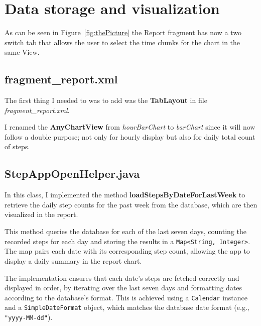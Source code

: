 \section{Data storage and visualization}
    
    As can be seen in Figure~\ref{fig:thePicture} the Report fragment has now a two switch tab
    that allows the user to select the time chunks for the chart in the same View.
    
\subsection{fragment\_report.xml}\label{subsec:fragment_report.xml}
        The first thing I needed to was to add was the \textbf{TabLayout} in file
        \textit{fragment\_report.xml}.

    
    
    I renamed the \textbf{AnyChartView} from \textit{hourBarChart} to \textit{barChart}
        since it will now follow a double purpose; not only for hourly display but also for daily total count of steps.
    
    \subsection{StepAppOpenHelper.java}
        In this class, I implemented the method \textbf{loadStepsByDateForLastWeek} to retrieve the daily step counts for the past week from the database, which are then visualized in the report.
        
        This method queries the database for each of the last seven days, counting the recorded steps for each day and storing the results in a \texttt{Map<String, Integer>}. The map pairs each date with its corresponding step count, allowing the app to display a daily summary in the report chart.
        
        The implementation ensures that each date’s steps are fetched correctly and displayed in order, by iterating over the last seven days and formatting dates according to the database’s format. This is achieved using a \texttt{Calendar} instance and a \texttt{SimpleDateFormat} object, which matches the database date format (e.g., \texttt{"yyyy-MM-dd"}).
        
        
        

